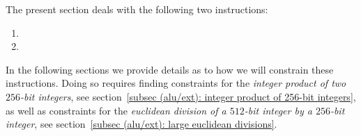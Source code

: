 The present section deals with the following two instructions:
\begin{multicols}{2}
	\begin{enumerate}
		\item {}
		\item {}
	\end{enumerate}
\end{multicols}
\noindent In the following sections we provide details as to how we will constrain these instructions. Doing so requires finding 
constraints for the \emph{integer product of two $256$-bit integers},
see section~\ref{subsec (alu/ext): integer product of 256-bit integers},
as well as 
constraints for the \emph{euclidean division of a $512$-bit integer by a $256$-bit integer},
see section~\ref{subsec (alu/ext): large euclidean divisions}.

